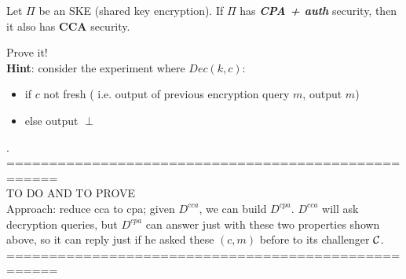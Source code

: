 \begin{theorem}
    Let $\Pi$ be an SKE (shared key encryption). If $\Pi$ has \textbf{
    \textit{CPA + auth} } security, then it also has \textbf{CCA} security.
\end{theorem}

\begin{exercise}
    Prove it!\\
    \textbf{Hint}: consider the experiment where $Dec(k, c)$:
    \begin{itemize}
        \item if $c$ not fresh ( i.e. output of previous encryption query $m$,
            output $m$)
        \item else output $\perp$
    \end{itemize}
    .
    ====================================================\\
    TO DO AND TO PROVE\\
    Approach: reduce cca to cpa; given $D^{cca}$, we can build $D^{cpa}$.
    $D^{cca}$ will ask decryption queries, but $D^{cpa}$ can answer just with
    these two properties shown above, so it can reply just if he asked these
    $(c, m)$ before to its challenger $\mathcal{C}$.
    ====================================================\\
\end{exercise}

